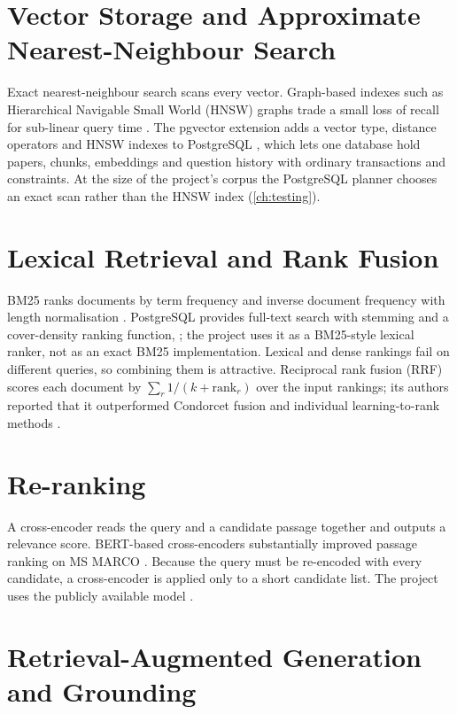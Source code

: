 \section{Vector Storage and Approximate Nearest-Neighbour Search}

Exact nearest-neighbour search scans every vector. Graph-based indexes such as Hierarchical Navigable Small World
(HNSW) graphs trade a small loss of recall for sub-linear query time \cite{malkov2020hnsw}. The pgvector extension
adds a vector type, distance operators and HNSW indexes to PostgreSQL \cite{pgvector}, which lets one database hold
papers, chunks, embeddings and question history with ordinary transactions and constraints. At the size of the
project's corpus the PostgreSQL planner chooses an exact scan rather than the HNSW index (\autoref{ch:testing}).

\section{Lexical Retrieval and Rank Fusion}

BM25 ranks documents by term frequency and inverse document frequency with length normalisation
\cite{robertson2009bm25,manning2008ir}. PostgreSQL provides full-text search with stemming and a cover-density
ranking function,  \cite{pgtextsearch}; the project uses it as a BM25-style lexical ranker, not
as an exact BM25 implementation. Lexical and dense rankings fail on different queries, so combining them is
attractive. Reciprocal rank fusion (RRF) scores each document by $\sum_r 1/(k + \mathrm{rank}_r)$ over the input
rankings; its authors reported that it outperformed Condorcet fusion and individual learning-to-rank methods
\cite{cormack2009rrf}.

\section{Re-ranking}

A cross-encoder reads the query and a candidate passage together and outputs a relevance score. BERT-based
cross-encoders substantially improved passage ranking on MS MARCO \cite{nogueira2019rerank}. Because the query must
be re-encoded with every candidate, a cross-encoder is applied only to a short candidate list. The project uses the
publicly available  model \cite{crossencodercard}.

\section{Retrieval-Augmented Generation and Grounding}

